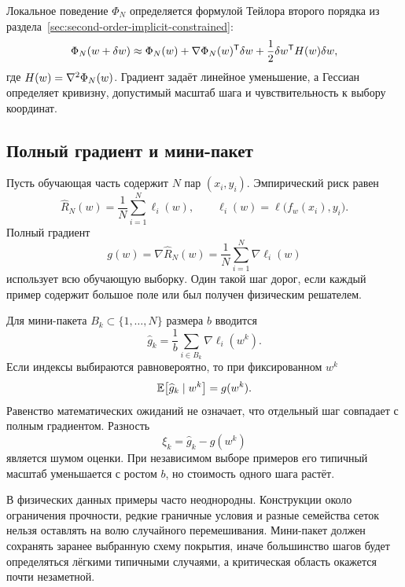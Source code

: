 \begin{connection}
Локальное поведение $\Phi_N$ определяется формулой Тейлора второго порядка из раздела~\ref{sec:second-order-implicit-constrained}:
\begin{equation}
\label{eq:training-local-quadratic}
 \Phi_N(w+\delta w)
 \approx
 \Phi_N(w)
 +\nabla\Phi_N(w)^{\mathsf{T}}\delta w
 +\frac12\delta w^{\mathsf{T}}H(w)\delta w,
\end{equation}
где $H(w)=\nabla^{2}\Phi_N(w)$. Градиент задаёт линейное уменьшение, а Гессиан определяет кривизну, допустимый масштаб шага и чувствительность к выбору координат.
\end{connection}

\subsection{Полный градиент и мини-пакет}
Пусть обучающая часть содержит $N$ пар $(x_i,y_i)$. Эмпирический риск равен
\begin{equation}
 \widehat R_N(w)
 =
 \frac1N\sum_{i=1}^{N}\ell_i(w),
 \qquad
 \ell_i(w)
 =
 \ell\bigl(f_w(x_i),y_i\bigr).
\end{equation}
Полный градиент
\begin{equation}
 g(w)
 =
 \nabla\widehat R_N(w)
 =
 \frac1N\sum_{i=1}^{N}\nabla\ell_i(w)
\end{equation}
использует всю обучающую выборку. Один такой шаг дорог, если каждый пример содержит большое поле или был получен физическим решателем.

Для мини-пакета $B_k\subset\{1,\ldots,N\}$ размера $b$ вводится
\begin{equation}
 \widehat g_k
 =
 \frac1b\sum_{i\in B_k}\nabla\ell_i(w^k).
\end{equation}
Если индексы выбираются равновероятно, то при фиксированном $w^k$
\begin{equation}
 \mathbb{E}\bigl[\widehat g_k\mid w^k\bigr]
 =
 g(w^k).
\end{equation}
Равенство математических ожиданий не означает, что отдельный шаг совпадает с полным градиентом. Разность
\begin{equation}
\label{eq:minibatch-noise}
 \xi_k
 =
 \widehat g_k-g(w^k)
\end{equation}
является шумом оценки. При независимом выборе примеров его типичный масштаб уменьшается с ростом $b$, но стоимость одного шага растёт.

В физических данных примеры часто неоднородны. Конструкции около ограничения прочности, редкие граничные условия и разные семейства сеток нельзя оставлять на волю случайного перемешивания. Мини-пакет должен сохранять заранее выбранную схему покрытия, иначе большинство шагов будет определяться лёгкими типичными случаями, а критическая область окажется почти незаметной.

